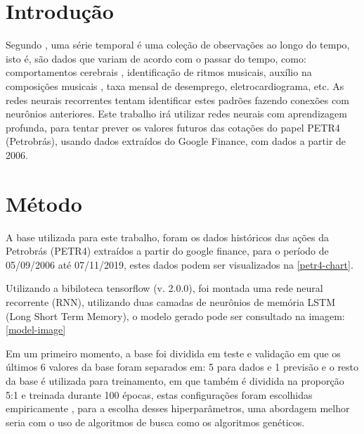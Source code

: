 \documentclass[
	article,			%
	11pt,				%
	oneside,			%
	a4paper,			%
	english,			%
	brazil,				%
	sumario=tradicional
	]{abntex2}
\begin{document}

\textual

\section{Introdução}

Segundo , uma série temporal é uma coleção de observações ao longo do tempo, isto é, são dados que variam de acordo com o passar do tempo, como: comportamentos cerebrais , identificação de ritmos musicais, auxílio na composições musicais , taxa mensal de desemprego, eletrocardiograma, etc. As redes neurais recorrentes tentam identificar estes padrões fazendo conexões com neurônios anteriores. Este trabalho irá utilizar redes neurais com aprendizagem profunda, para tentar prever os valores futuros das cotações do papel PETR4 (Petrobrás), usando dados extraídos do Google Finance, com dados a partir de 2006.

\section{Método}

A base utilizada para este trabalho, foram os dados históricos das ações da Petrobrás (PETR4) extraídos a partir do google finance, para o período de 05/09/2006 até 07/11/2019, estes dados podem ser visualizados na \autoref{petr4-chart}.

Utilizando a bibiloteca tensorflow (v. 2.0.0), foi montada uma rede neural recorrente (RNN), utilizando duas camadas de neurônios de memória LSTM (Long Short Term Memory), o modelo gerado pode ser consultado na imagem: \autoref{model-image}

Em um primeiro momento, a base foi dividida em teste e validação em que os últimos 6 valores da base foram separados em: 5 para dados e 1 previsão e o resto da base é utilizada para treinamento, em que também é dividida na proporção 5:1 e treinada durante 100 épocas, estas configurações foram escolhidas empiricamente , para a escolha desses hiperparâmetros, uma abordagem melhor seria com o uso de algoritmos de busca como os algoritmos genéticos.
\end{document}

